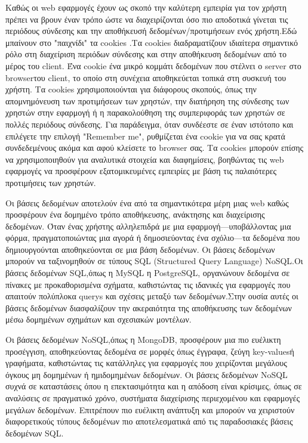 Καθώς οι \lt web \gt εφαρμογές έχουν ως σκοπό την καλύτερη εμπειρία για τον χρήστη πρέπει να βρουν έναν τρόπο ώστε να διαχειρίζονται όσο πιο αποδοτικά γίνεται τις περιόδους σύνδεσης και την αποθήκευσή δεδομένων/προτιμήσεων ενός χρήστη.Εδώ μπαίνουν στο "παιχνίδι" τα \lt cookies \gt.Τα \lt cookies \gt διαδραματίζουν ιδιαίτερα σημαντικό ρόλο στη διαχείριση περιόδων σύνδεσης και στην αποθήκευση δεδομένων από το μέρος του \lt client\gt. Ένα \lt cookie  ένα μικρό κομμάτι δεδομένων που στέλνει ο server στο \lt browser\gt  του \lt client\gt, το οποίο στη συνέχεια αποθηκεύεται τοπικά στη συσκευή του χρήστη. Τα \lt cookies \gt χρησιμοποιούνται για διάφορους σκοπούς, όπως την απομνημόνευση των προτιμήσεων των χρηστών, την διατήρηση της σύνδεσης των χρηστών στην εφαρμογή ή η παρακολούθηση της συμπεριφοράς των χρηστών σε πολλές περιόδους σύνδεσης. Για παράδειγμα, όταν συνδέεστε σε έναν ιστότοπο και επιλέγετε την επιλογή \lt "Remember me"\gt, ρυθμίζεται ένα \lt cookie \gt για να σας κρατά συνδεδεμένους ακόμα και αφού κλείσετε το \lt browser \gt σας. Τα \lt cookies \gt μπορούν επίσης να χρησιμοποιηθούν για αναλυτικά στοιχεία και διαφημίσεις, βοηθώντας τις \lt web \gt εφαρμογές  να προσφέρουν εξατομικευμένες εμπειρίες με βάση τις παλαιότερες προτιμήσεις των χρηστών.

Οι βάσεις δεδομένων αποτελούν ένα από τα σημαντικότερα μέρη μιας \lt web  καθώς προσφέρουν  ένα δομημένο τρόπο αποθήκευσης, ανάκτησης και διαχείρισης δεδομένων. Όταν ένας χρήστης αλληλεπιδρά με μια εφαρμογή—υποβάλλοντας μια φόρμα, πραγματοποιώντας μια αγορά ή δημοσιεύοντας ένα σχόλιο—τα δεδομένα που δημιουργούνται αποθηκεύονται σε μια βάση δεδομένων. Οι βάσεις δεδομένων μπορούν να ταξινομηθούν σε τύπους \lt SQL (Structured Query Language)  \lt NoSQL\gt.Οι βάσεις δεδομένων \lt SQL,\gt όπως η \lt MySQL  η \lt PostgreSQL\gt, οργανώνουν δεδομένα σε πίνακες με προκαθορισμένα σχήματα, καθιστώντας τις ιδανικές για εφαρμογές που απαιτούν πολύπλοκα \lt querys \gt και σχέσεις μεταξύ των δεδομένων.Στην ουσία αυτές οι βάσεις δεδομένων διασφαλίζουν την ακεραιότητα της αποθήκευσης των δεδομένων μέσω δομημένων σχημάτων και σχεσιακών μοντέλων.

Οι βάσεις δεδομένων \lt NoSQL,\gt όπως η \lt MongoDB\gt, προσφέρουν μια πιο ευέλικτη προσέγγιση, αποθηκεύοντας δεδομένα σε μορφές όπως έγγραφα, ζεύγη \lt key-values\gt ή γραφήματα, καθιστώντας τις κατάλληλες για εφαρμογές που χειρίζονται μεγάλους όγκους μη δομημένων ή ημιδομημένων δεδομένων. Οι βάσεις δεδομένων \lt NoSQL  συχνά σε καταστάσεις όπου η επεκτασιμότητα και η απόδοση είναι κρίσιμες, όπως σε αναλύσεις σε πραγματικό χρόνο, συστήματα διαχείρισης περιεχομένου και εφαρμογές μεγάλων δεδομένων. Επιτρέπουν πιο ευέλικτη ανάπτυξη και μπορούν να χειριστούν διαφορετικούς τύπους δεδομένων πιο αποτελεσματικά από τις παραδοσιακές βάσεις δεδομένων \lt SQL\gt.



